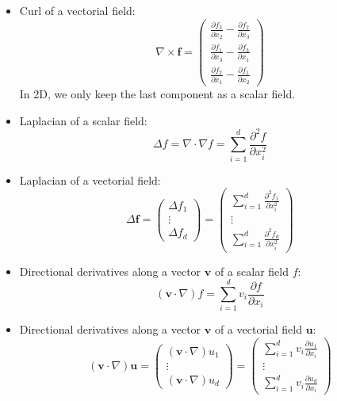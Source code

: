 \documentclass{article}
\begin{document}
\begin{itemize}
\item
  Curl of a vectorial field:
  \begin{equation*}
    \nabla\times\mathbf{f} =
    \begin{pmatrix}
      \frac{\partial f_3}{\partial x_2} - \frac{\partial f_2}{\partial x_3} \\
      \frac{\partial f_1}{\partial x_3} - \frac{\partial f_3}{\partial x_1} \\
      \frac{\partial f_2}{\partial x_1} - \frac{\partial f_1}{\partial x_2}
    \end{pmatrix}
  \end{equation*}
  In 2D, we only keep the last component as a scalar field.
\item
  Laplacian of a scalar field:
  \begin{equation*}
    \Delta f = \nabla\cdot\nabla f =
    \sum_{i=1}^d \frac{\partial^2 f}{\partial x_i^2}
  \end{equation*}
\item
  Laplacian of a vectorial field:
  \begin{equation*}
    \Delta \mathbf{f} =
    \begin{pmatrix}
      \Delta f_1 \\ \vdots \\ \Delta f_d
    \end{pmatrix} =
    \begin{pmatrix}
      \sum_{i=1}^d \frac{\partial^2 f_1}{\partial x_i^2}\\
      \vdots \\
      \sum_{i=1}^d \frac{\partial^2 f_d}{\partial x_i^2}
    \end{pmatrix}
  \end{equation*}
\item
  Directional derivatives along a vector $\mathbf{v}$ of a scalar field $f$:
  \begin{equation*}
    (\mathbf{v}\cdot\nabla)f =
    \sum_{i=1}^d v_i\frac{\partial f}{\partial x_i}
  \end{equation*}
\item
  Directional derivatives along a vector $\mathbf{v}$ of a vectorial field
  $\mathbf{u}$:
  \begin{equation*}
    (\mathbf{v}\cdot\nabla)\mathbf{u} =
    \begin{pmatrix}
      (\mathbf{v}\cdot\nabla)u_1 \\
      \vdots \\
      (\mathbf{v}\cdot\nabla)u_d
    \end{pmatrix} =
    \begin{pmatrix}
      \sum_{i=1}^d v_i\frac{\partial u_1}{\partial x_i} \\
      \vdots \\
      \sum_{i=1}^d v_i\frac{\partial u_d}{\partial x_i}
    \end{pmatrix}
  \end{equation*}
\end{itemize}
\end{document}
